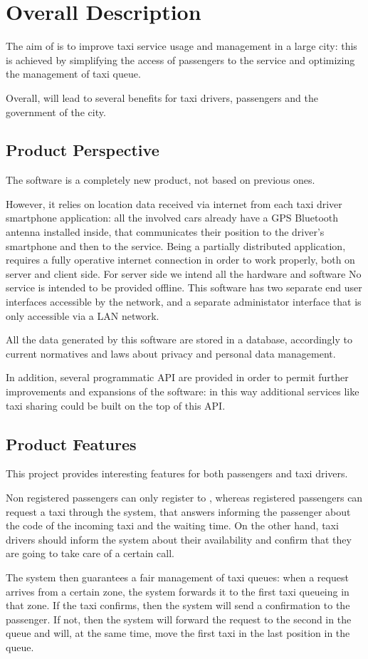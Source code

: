 \section{Overall Description}
The aim of \myTaxiService{} is to improve taxi service usage and management in a large city: this is achieved by simplifying the access of passengers to the service and optimizing the management of taxi queue.\par
Overall, \myTaxiService{} will lead to several benefits for taxi drivers, passengers and the government of the city.
\subsection{Product Perspective}
The software \myTaxiService{} is a completely new product, not based on previous ones.\par
However, it relies on location data received via internet from each taxi driver smartphone application: all the involved cars already have a GPS Bluetooth antenna installed inside, that communicates their position to the driver's smartphone and then to the service.
Being a partially distributed application, \myTaxiService{} requires a fully operative internet connection in order to work properly, both on server and client side.
For server side we intend all the hardware and software 
No service is intended to be provided offline.
This software has two separate end user interfaces accessible by the network, and a separate administator interface that is only accessible via a LAN network.\par
All the data generated by this software are stored in a database, accordingly to current normatives and laws about privacy and personal data management.\par
In addition, several programmatic API are provided in order to permit further improvements and expansions of the software: in this way additional services like taxi sharing could be built on the top of this API.
\subsection{Product Features}
This project provides interesting features for both passengers and taxi drivers.\par
Non registered passengers can only register to \myTaxiService{}, whereas registered passengers can request a taxi through the system, that answers informing the passenger about the code of the incoming taxi and the waiting time.
On the other hand, taxi drivers should inform the system about their availability and confirm that they are going to take care of a certain call.\par
The system then guarantees a fair management of taxi queues: when a request arrives from a certain zone, the system forwards it to the first taxi queueing in that zone.
If the taxi confirms, then the system will send a confirmation to the passenger.
If not, then the system will forward the request to the second in the queue and will, at the same time, move the first taxi in the last position in the queue.
